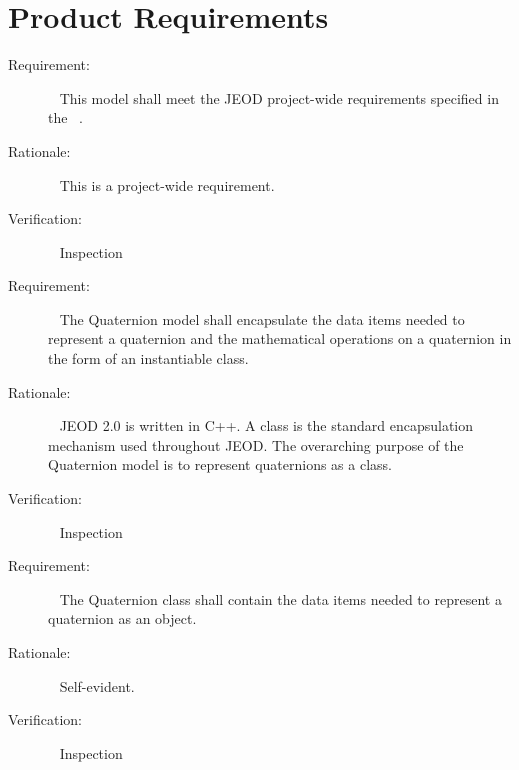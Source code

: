 
\chapter{Product Requirements}\label{ch:reqt}

\label{reqt:project}
\begin{description}
\item[Requirement:]\ \newline
  This model shall meet the JEOD project-wide requirements specified in
  the \JEODid\ .

\item[Rationale:]\ \newline
  This is a project-wide requirement.

\item[Verification:]\ \newline
  Inspection
\end{description}


\label{reqt:encapsulation}
\begin{description}
\item[Requirement:]\ \newline
  The Quaternion model shall encapsulate the data items needed to represent
  a quaternion and the mathematical operations on a quaternion in the form
  of an instantiable class.

\item[Rationale:]\ \newline
  JEOD 2.0 is written in C++. A class is the standard encapsulation
  mechanism used throughout JEOD.
  The overarching purpose of the Quaternion model is to represent
  quaternions as a class.

\item[Verification:]\ \newline
  Inspection
\end{description}


\label{reqt:data}
\begin{description}
\item[Requirement:]\ \newline
  The Quaternion class shall contain the data items needed to
  represent a quaternion as an object.

\item[Rationale:]\ \newline
  Self-evident.

\item[Verification:]\ \newline
  Inspection
\end{description}

